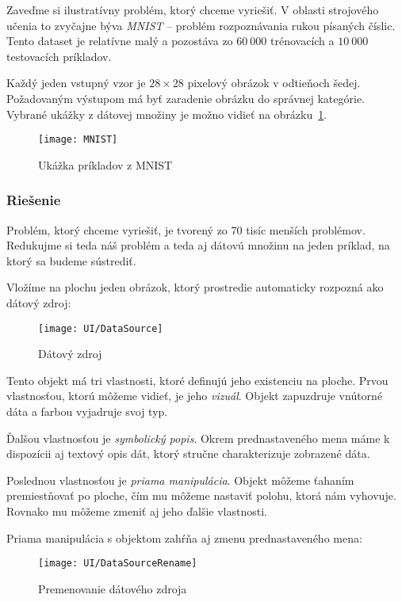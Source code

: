 Zaveďme si ilustratívny problém, ktorý chceme vyriešiť. V oblasti strojového učenia to zvyčajne býva \emph{MNIST} -- problém rozpoznávania rukou písaných číslic.\autocite{LeCunn1998} Tento dataset je relatívne malý a pozostáva zo $60{~}000$ trénovacích a $10{~}000$ testovacích príkladov.

Každý jeden vstupný vzor je $28 \times 28$ pixelový obrázok v odtieňoch šedej. Požadovaným výstupom má byť zaradenie obrázku do správnej kategórie. Vybrané ukážky z dátovej množiny je možno vidieť na obrázku~\ref{fig:MNIST}.

\begin{figure}[b]
  \centering
  \texttt{[image: MNIST]}
  \caption{Ukážka príkladov z MNIST}
  \label{fig:MNIST}
\end{figure}

\subsubsection{Riešenie}

Problém, ktorý chceme vyriešiť, je tvorený zo 70 tisíc menších problémov. Redukujme si teda náš problém a teda aj dátovú množinu na jeden príklad, na ktorý sa budeme sústrediť.

Vložíme na plochu jeden obrázok, ktorý prostredie automaticky rozpozná ako dátový zdroj:

\begin{figure}[H]
  \centering
  \texttt{[image: UI/DataSource]}
  \caption{Dátový zdroj}
\end{figure}

Tento objekt má tri vlastnosti, ktoré definujú jeho existenciu na ploche. Prvou vlastnosťou, ktorú môžeme vidieť, je jeho \emph{vizuál}. Objekt zapuzdruje vnútorné dáta a farbou vyjadruje svoj typ.

Ďalšou vlastnosťou je \emph{symbolický popis}. Okrem prednastaveného mena máme k dispozícii aj textový opis dát, ktorý stručne charakterizuje zobrazené dáta. 

Poslednou vlastnosťou je \emph{priama manipulácia}. Objekt môžeme ťahaním premiestňovať po ploche, čím mu môžeme nastaviť polohu, ktorá nám vyhovuje. Rovnako mu môžeme zmeniť aj jeho ďalšie vlastnosti.

\bigskip

Priama manipulácia s objektom zahŕňa aj zmenu prednastaveného mena:

\begin{figure}[H]
  \centering
  \texttt{[image: UI/DataSourceRename]}
  \caption{Premenovanie dátového zdroja}
\end{figure}

